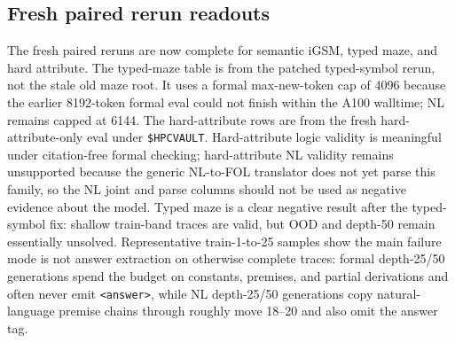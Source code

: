 \documentclass[10pt]{article}
\begin{document}
\subsection{Fresh paired rerun readouts}
The fresh paired reruns are now complete for semantic iGSM, typed maze, and hard attribute. The typed-maze table is from the patched typed-symbol rerun, not the stale old maze root. It uses a formal max-new-token cap of 4096 because the earlier 8192-token formal eval could not finish within the A100 walltime; NL remains capped at 6144. The hard-attribute rows are from the fresh hard-attribute-only eval under \texttt{\$HPCVAULT}. Hard-attribute logic validity is meaningful under citation-free formal checking; hard-attribute NL validity remains unsupported because the generic NL-to-FOL translator does not yet parse this family, so the NL joint and parse columns should not be used as negative evidence about the model. Typed maze is a clear negative result after the typed-symbol fix: shallow train-band traces are valid, but OOD and depth-50 remain essentially unsolved. Representative train-1-to-25 samples show the main failure mode is not answer extraction on otherwise complete traces: formal depth-25/50 generations spend the budget on constants, premises, and partial derivations and often never emit \texttt{<answer>}, while NL depth-25/50 generations copy natural-language premise chains through roughly move 18--20 and also omit the answer tag.
\end{document}
